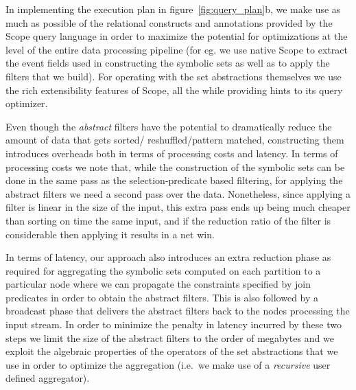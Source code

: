 In implementing the execution plan in figure~\ref{fig:query_plan}b,
we make use as much as possible of the relational constructs and annotations 
provided by the Scope query language in order to maximize the potential for 
optimizations at the level of the entire data processing pipeline (for eg. we 
use native Scope to extract the event fields used in constructing the symbolic 
sets as well as to apply the filters that we build).
For operating with the set abstractions themselves we use the rich 
extensibility features of Scope, all the while providing hints to its query 
optimizer.

Even though the {\em abstract} filters have the potential to dramatically 
reduce the amount of data that gets sorted\allowbreak /\allowbreak 
reshuffled\allowbreak /\allowbreak pattern matched, 
constructing them introduces overheads both in terms of processing costs and 
latency.
In terms of processing costs we note that, while the construction of the 
symbolic sets can be done in the same pass as the selection-predicate based 
filtering, for applying the abstract filters we need a second pass over the 
data.
Nonetheless, since applying a filter is linear in the size of the input, this 
extra pass ends up being much cheaper than sorting on time the same input, and 
if the reduction ratio of the filter is considerable then applying it results 
in a net win. 
   
In terms of latency, our approach also introduces an extra reduction phase as 
required for aggregating the symbolic sets computed on each partition to a 
particular node where we can propagate the constraints specified by join 
predicates in order to obtain the abstract filters.
This is also followed by a broadcast phase that delivers the abstract filters 
back to the nodes processing the input stream.
In order to minimize the penalty in latency incurred by these two steps we 
limit the size of the abstract filters to the order of megabytes and we exploit 
the algebraic properties of the operators of the set abstractions that we use 
in order to optimize the aggregation (i.e.\ we make use of a {\em recursive} 
user defined aggregator).





  
  
  
  